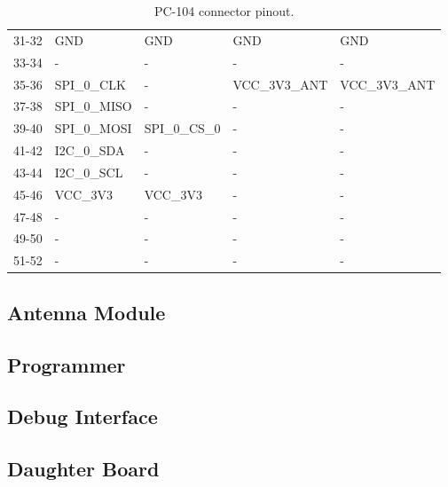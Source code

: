 \begin{table}[!h]
\begin{tabular}{cllll}
        31-32              & GND              & GND              & GND           & GND           \\
        33-34              & -                & -                & -             & -             \\
        35-36              & SPI\_0\_CLK      & -                & VCC\_3V3\_ANT & VCC\_3V3\_ANT \\
        37-38              & SPI\_0\_MISO     & -                & -             & -             \\
        39-40              & SPI\_0\_MOSI     & SPI\_0\_CS\_0    & -             & -             \\
        41-42              & I2C\_0\_SDA      & -                & -             & -             \\
        43-44              & I2C\_0\_SCL      & -                & -             & -             \\
        45-46              & VCC\_3V3         & VCC\_3V3         & -             & -             \\
        47-48              & -                & -                & -             & -             \\
        49-50              & -                & -                & -             & -             \\
        51-52              & -                & -                & -             & -             \\
        \bottomrule[1.5pt]
    \end{tabular}
    \caption{PC-104 connector pinout.}
    \label{tab:pc104-pins}
\end{table}

\subsection{Antenna Module}



\subsection{Programmer}



\subsection{Debug Interface}



\subsection{Daughter Board}



